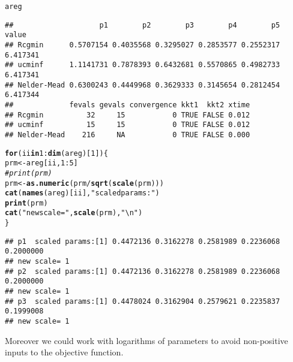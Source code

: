 \documentclass[11pt]{article}\usepackage[]{graphicx}\usepackage[]{color}
\makeatletter
\newcommand{\hlnum}[1]{\textcolor[rgb]{0.686,0.059,0.569}{#1}}%
\newcommand{\hlstr}[1]{\textcolor[rgb]{0.192,0.494,0.8}{#1}}%
\newcommand{\hlcom}[1]{\textcolor[rgb]{0.678,0.584,0.686}{\textit{#1}}}%
\newcommand{\hlopt}[1]{\textcolor[rgb]{0,0,0}{#1}}%
\newcommand{\hlstd}[1]{\textcolor[rgb]{0.345,0.345,0.345}{#1}}%
\newcommand{\hlkwa}[1]{\textcolor[rgb]{0.161,0.373,0.58}{\textbf{#1}}}%
\newcommand{\hlkwb}[1]{\textcolor[rgb]{0.69,0.353,0.396}{#1}}%
\newcommand{\hlkwd}[1]{\textcolor[rgb]{0.737,0.353,0.396}{\textbf{#1}}}%
\newenvironment{kframe}{%
 \def\at@end@of@kframe{}%
 \ifinner\ifhmode%
  \def\at@end@of@kframe{\end{minipage}}%
  \begin{minipage}{\columnwidth}%
 \fi\fi%
 \def\FrameCommand##1{\hskip\@totalleftmargin \hskip-\fboxsep
 \colorbox{shadecolor}{##1}\hskip-\fboxsep
     \hskip-\linewidth \hskip-\@totalleftmargin \hskip\columnwidth}%
 \MakeFramed {\advance\hsize-\width
   \@totalleftmargin\z@ \linewidth\hsize
   \@setminipage}}%
 {\par\unskip\endMakeFramed%
 \at@end@of@kframe}
\newenvironment{knitrout}{}{} %
\makeatother
\begin{document}
\begin{knitrout}
\begin{kframe}
{\ttfamily\noindent\color{warningcolor}{\#\# Warning in log(x/sc): NaNs produced}}

{\ttfamily\noindent\color{warningcolor}{\#\# Warning in Rcgminu(par = spar, fn = efn, gr = egr, control = mcontrol, ...): Rcgmin - undefined function}}

{\ttfamily\noindent\color{warningcolor}{\#\# Warning in log(x/sc): NaNs produced}}

{\ttfamily\noindent\color{warningcolor}{\#\# Warning in Rcgminu(par = spar, fn = efn, gr = egr, control = mcontrol, ...): Rcgmin - undefined function}}\begin{alltt}
\hlstd{areg}
\end{alltt}
\begin{verbatim}
##                    p1        p2        p3        p4        p5    value
## Rcgmin      0.5707154 0.4035568 0.3295027 0.2853577 0.2552317 6.417341
## ucminf      1.1141731 0.7878393 0.6432681 0.5570865 0.4982733 6.417341
## Nelder-Mead 0.6300243 0.4449968 0.3629333 0.3145654 0.2812454 6.417344
##             fevals gevals convergence kkt1  kkt2 xtime
## Rcgmin          32     15           0 TRUE FALSE 0.012
## ucminf          15     15           0 TRUE FALSE 0.012
## Nelder-Mead    216     NA           0 TRUE FALSE 0.000
\end{verbatim}
\begin{alltt}
\hlkwa{for} \hlstd{(ii} \hlkwa{in} \hlnum{1}\hlopt{:}\hlkwd{dim}\hlstd{(areg)[}\hlnum{1}\hlstd{])\{}
    \hlstd{prm} \hlkwb{<-} \hlstd{areg[ii,}\hlnum{1}\hlopt{:}\hlnum{5}\hlstd{]}
\hlcom{#    print(prm)}
    \hlstd{prm}\hlkwb{<-}\hlkwd{as.numeric}\hlstd{(prm}\hlopt{/}\hlkwd{sqrt}\hlstd{(}\hlkwd{scale}\hlstd{(prm)))}
    \hlkwd{cat}\hlstd{(}\hlkwd{names}\hlstd{(areg)[ii],}\hlstr{" scaled params:"}\hlstd{)}
    \hlkwd{print}\hlstd{(prm)}
    \hlkwd{cat}\hlstd{(}\hlstr{"new scale="}\hlstd{,} \hlkwd{scale}\hlstd{(prm),}\hlstr{"\textbackslash{}n"}\hlstd{)}
\hlstd{\}}
\end{alltt}
\begin{verbatim}
## p1  scaled params:[1] 0.4472136 0.3162278 0.2581989 0.2236068 0.2000000
## new scale= 1 
## p2  scaled params:[1] 0.4472136 0.3162278 0.2581989 0.2236068 0.2000000
## new scale= 1 
## p3  scaled params:[1] 0.4478024 0.3162904 0.2579621 0.2235837 0.1999008
## new scale= 1
\end{verbatim}
\end{kframe}
\end{knitrout}

Moreover we could work with logarithms of parameters to avoid non-positive inputs to the objective function.
\end{document}
